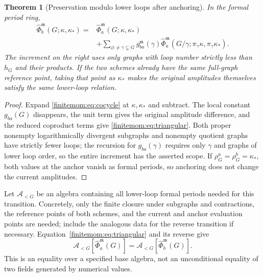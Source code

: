 \documentclass[11pt,a4paper,oneside]{article}
\theoremstyle{plain}
\newtheorem{theorem}{Theorem}[section]
\theoremstyle{definition}
\theoremstyle{remark}
\numberwithin{equation}{section}
\begin{document}
\begin{theorem}[Preservation modulo lower loops after anchoring]\label{finitemom:thm:anchor}
In the formal period ring,
\begin{align}\label{finitemom:eq:triangular}
 \widehat\Phi_b^{\mathfrak m}(G;\kappa,\kappa_*)
 ={}&\widehat\Phi_a^{\mathfrak m}(G;\kappa,\kappa_*)\nonumber\\
 &+\sum_{\varnothing\ne\gamma\subsetneq G}
 g_{ba}^{\mathfrak m}(\gamma)
 \widehat\Phi_a^{\mathfrak m}
       (G/\gamma;\pi_\gamma\kappa,\pi_\gamma\kappa_*).
\end{align}
The increment on the right uses only graphs with loop number strictly less than $h_G$ and their products.
If the two schemes already have the same full-graph reference point, taking that point as $\kappa_*$ makes the original amplitudes themselves satisfy the same lower-loop relation.
\end{theorem}
\begin{proof}
Expand \eqref{finitemom:eq:cocycle} at $\kappa,\kappa_*$ and subtract.
The local constant $g_{ba}(G)$ disappears, the unit term gives the original amplitude difference, and the reduced coproduct terms give \eqref{finitemom:eq:triangular}.
Both proper nonempty logarithmically divergent subgraphs and nonempty quotient graphs have strictly fewer loops; the recursion for $g_{ba}(\gamma)$ requires only $\gamma$ and graphs of lower loop order, so the entire increment has the asserted scope.
If $\rho_G^a=\rho_G^b=\kappa_*$, both values at the anchor vanish as formal periods, so anchoring does not change the current amplitudes.
\end{proof}

Let $\mathcal A_{<G}$ be an algebra containing all lower-loop formal periods needed for this transition.
Concretely, only the finite closure under subgraphs and contractions, the reference points of both schemes, and the current and anchor evaluation points are needed; include the analogous data for the reverse transition if necessary.
Equation~\eqref{finitemom:eq:triangular} and its reverse give
\begin{equation}\label{finitemom:eq:algebra}
 \mathcal A_{<G}[\widehat\Phi_a^{\mathfrak m}(G)]
       =\mathcal A_{<G}[\widehat\Phi_b^{\mathfrak m}(G)].
\end{equation}
This is an equality over a specified base algebra, not an unconditional equality of two fields generated by numerical values.
\end{document}
